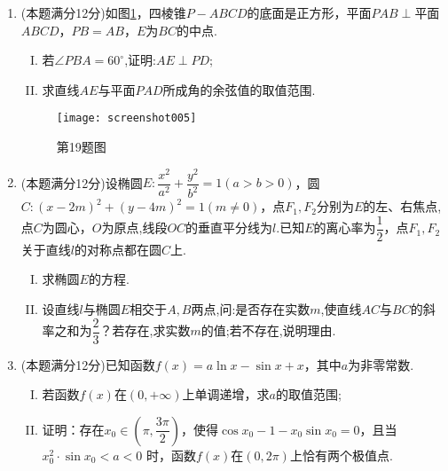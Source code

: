 \documentclass[11pt]{article}
\begin{document}
\begin{enumerate}
	\item (本题满分12分)如图\ref{fig:screenshot005}，四棱锥$ P-ABCD $的底面是正方形，平面$ PAB \perp$平面$ ABCD $，$ PB=AB $，$ E $为$ BC $的中点.
	\begin{enumerate}[(I)]
		\item 若$ \angle PBA=60^\circ $,证明:$ AE\perp PD $;
		\item 求直线$ AE $与平面$ PAD $所成角的余弦值的取值范围.
	\end{enumerate}
	\begin{figure}[htbp]
		\centering
		\texttt{[image: screenshot005]}
		\caption{\heiti 第19题图}
		\label{fig:screenshot005}
	\end{figure}
	
	
	\item (本题满分12分)设椭圆$ E:\dfrac{x^2}{a^2}+\dfrac{y^2}{b^2}=1(a>b>0) $，圆$ C:(x-2m)^2+(y-4m)^2=1(m\neq 0) $，点$ F_1,F_2 $分别为$ E $的左、右焦点,点$ C $为圆心，$ O $为原点,线段$ OC $的垂直平分线为$ l $.已知$ E $的离心率为$ \dfrac{1}{2} $，点$ F_1,F_2 $关于直线$ l $的对称点都在圆$ C $上.
	\begin{enumerate}[(I)]
		\item 求椭圆$ E $的方程.
		\item 设直线$ l $与椭圆$ E $相交于$ A,B $两点,问:是否存在实数$ m $,使直线$ AC $与$ BC $的斜率之和为$ \dfrac{2}{3} $？若存在,求实数$ m $的值;若不存在,说明理由.
	\end{enumerate}
	
	\item (本题满分12分)已知函数$ f(x)=a\ln x-\sin x+x $，其中$ a $为非零常数.
	\begin{enumerate}[(I)]
		\item 若函数$ f(x) $在$ (0,+\infty) $上单调递增，求$ a $的取值范围;
		\item 证明：存在$ x_0 \in \left ( \pi,\dfrac{3\pi}{2}  \right )  $，使得$ \cos x_0 - 1 - x_0 \sin x_0 =0$，且当$ x_0^2 \cdot \sin x_0 <a<0$	时，函数$ f(x) $在$ (0,2\pi) $上恰有两个极值点.
	\end{enumerate}
\end{enumerate}
\end{document}
